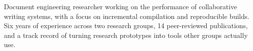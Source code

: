 
Document engineering researcher working on the performance of
collaborative writing systems, with a focus on incremental compilation
and reproducible builds. Six years of experience across two research
groups, \num{14} peer-reviewed publications, and a track record of
turning research prototypes into tools other groups actually use.

\vspace{2mm}
\noindent
{}\;
\;
\;
\;
